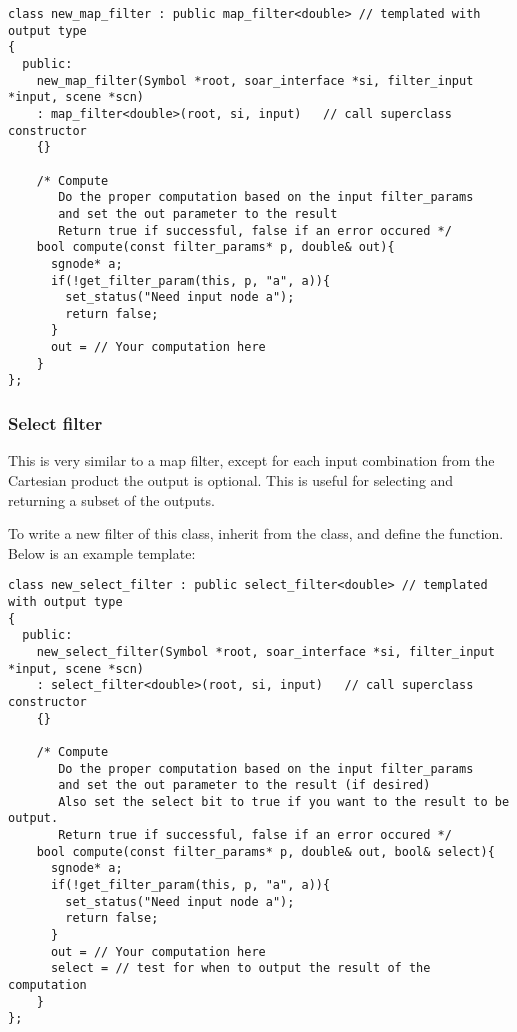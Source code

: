 {\footnotesize
\begin{verbatim}
class new_map_filter : public map_filter<double> // templated with output type
{
  public:
    new_map_filter(Symbol *root, soar_interface *si, filter_input *input, scene *scn)
    : map_filter<double>(root, si, input)   // call superclass constructor
    {}

    /* Compute
       Do the proper computation based on the input filter_params
       and set the out parameter to the result
       Return true if successful, false if an error occured */
    bool compute(const filter_params* p, double& out){
      sgnode* a;
      if(!get_filter_param(this, p, "a", a)){
        set_status("Need input node a");
        return false;
      }
      out = // Your computation here
    }
};
\end{verbatim}
}


\subsubsection{Select filter}

This is very similar to a map filter, except for each input combination from the
Cartesian product the output is optional. This is useful for selecting and returning
a subset of the outputs.

To write a new filter of this class, inherit from the  class,
and define the  function. Below is an example template:

{\footnotesize
\begin{verbatim}
class new_select_filter : public select_filter<double> // templated with output type
{
  public:
    new_select_filter(Symbol *root, soar_interface *si, filter_input *input, scene *scn)
    : select_filter<double>(root, si, input)   // call superclass constructor
    {}

    /* Compute
       Do the proper computation based on the input filter_params
       and set the out parameter to the result (if desired)
       Also set the select bit to true if you want to the result to be output.
       Return true if successful, false if an error occured */
    bool compute(const filter_params* p, double& out, bool& select){
      sgnode* a;
      if(!get_filter_param(this, p, "a", a)){
        set_status("Need input node a");
        return false;
      }
      out = // Your computation here
      select = // test for when to output the result of the computation
    }
};
\end{verbatim}
}


